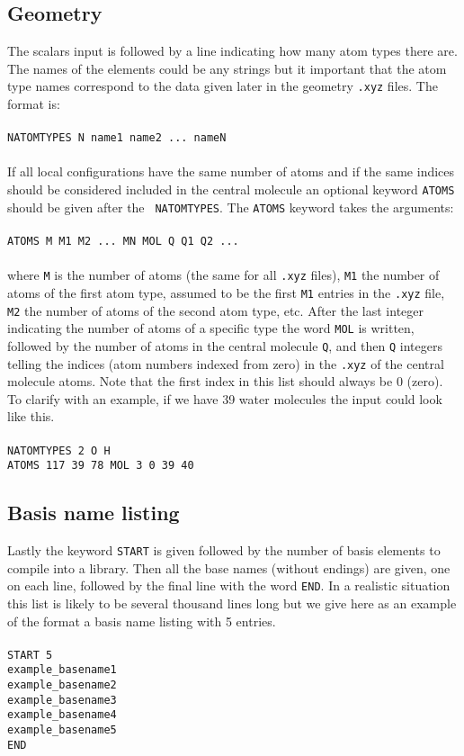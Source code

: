 \documentclass[a4paper, 10pt]{article}
\begin{document}
\subsection{Geometry}
The scalars input is followed by a line indicating how many atom types
there are. The names of the elements could be any strings but it
important that the atom type names correspond to the data given later
in the geometry {\tt .xyz} files. The format is:
\\\\
{\tt NATOMTYPES N name1 name2 ... nameN}
\\\\
If all local configurations have the same number of atoms and if the same
indices should be considered included in the central molecule an
optional keyword {\tt ATOMS} should be given after the {\tt
  NATOMTYPES}. The {\tt ATOMS} keyword takes the arguments:\\\\
{\tt ATOMS M M1 M2 ... MN MOL Q Q1 Q2 ...}\\\\
where {\tt M} is the number of atoms (the same for all {\tt .xyz} files),
{\tt M1} the number of atoms of the first atom type, assumed to be the first
{\tt M1} entries in the {\tt .xyz} file, {\tt M2} the number of atoms
of the second atom type, etc. After the last integer indicating the
number of atoms of a specific type the word {\tt MOL} is written,
followed by the number of atoms in the central molecule {\tt Q}, and
then {\tt Q} integers telling the indices (atom numbers indexed from zero)
in the {\tt .xyz} of
the central molecule atoms. Note that the first index in this list should
always be 0 (zero). To clarify with an example, if we have 39 water
molecules the input could look like this.\\\\
{\tt NATOMTYPES 2 O H}\\
{\tt ATOMS 117 39 78 MOL 3 0 39 40}

\subsection{Basis name listing}
Lastly the keyword {\tt START} is given followed by the number of
basis elements to compile into a library. Then all the base names
(without endings) are given, one on each line, followed by the final
line with the word {\tt END}. In a realistic situation this list is
likely to be several thousand lines long but we give here as an example of the
format a basis name listing with 5 entries.\\\\
{\tt START 5}\\
{\tt example\_basename1}\\
{\tt example\_basename2}\\
{\tt example\_basename3}\\
{\tt example\_basename4}\\
{\tt example\_basename5}\\
{\tt END}
\end{document}
